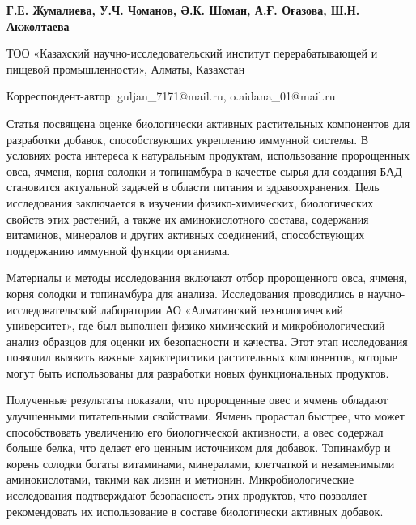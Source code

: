 
\begin{articleheader}

{\bfseries
Г.Е. Жумалиева\textsuperscript{\envelope },
У.Ч. Чоманов,
Ә.К. Шоман,
А.Ғ. Оғазова\textsuperscript{\envelope },
Ш.Н. Акжолтаева
}
\end{articleheader}

\begin{affiliation}
ТОО «Казахский научно-исследовательский институт перерабатывающей и
пищевой промышленности», Алматы, Казахстан

\raggedright \textsuperscript{\envelope }Корреспондент-автор: guljan\_7171@mail.ru, o.aidana\_01@mail.ru
\end{affiliation}

Статья посвящена оценке биологически активных растительных компонентов
для разработки добавок, способствующих укреплению иммунной системы. В
условиях роста интереса к натуральным продуктам, использование
пророщенных овса, ячменя, корня солодки и топинамбура в качестве сырья
для создания БАД становится актуальной задачей в области питания и
здравоохранения. Цель исследования заключается в изучении
физико-химических, биологических свойств этих растений, а также их
аминокислотного состава, содержания витаминов, минералов и других
активных соединений, способствующих поддержанию иммунной функции
организма.

Материалы и методы исследования включают отбор пророщенного овса,
ячменя, корня солодки и топинамбура для анализа. Исследования
проводились в научно-исследовательской лаборатории АО «Алматинский
технологический университет», где был выполнен физико-химический и
микробиологический анализ образцов для оценки их безопасности и
качества. Этот этап исследования позволил выявить важные характеристики
растительных компонентов, которые могут быть использованы для разработки
новых функциональных продуктов.

Полученные результаты показали, что пророщенные овес и ячмень обладают
улучшенными питательными свойствами. Ячмень прорастал быстрее, что может
способствовать увеличению его биологической активности, а овес содержал
больше белка, что делает его ценным источником для добавок. Топинамбур и
корень солодки богаты витаминами, минералами, клетчаткой и незаменимыми
аминокислотами, такими как лизин и метионин. Микробиологические
исследования подтверждают безопасность этих продуктов, что позволяет
рекомендовать их использование в составе биологически активных добавок.

